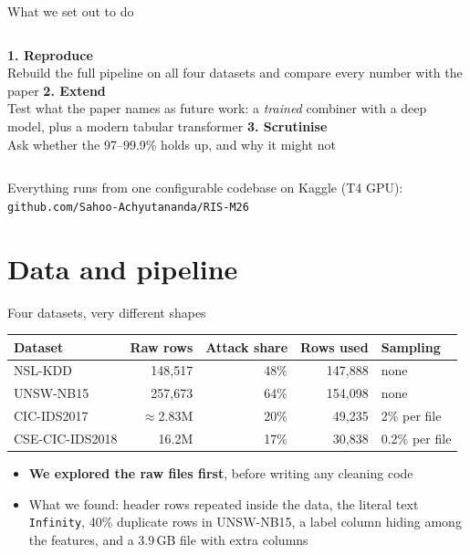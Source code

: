 \documentclass[aspectratio=169,11pt]{beamer}
\begin{document}
\begin{frame}{What we set out to do}
\begin{columns}[T]
\textcolor{accent}{\textbf{1. Reproduce}}\\[4pt]
\small Rebuild the full pipeline on all four datasets and compare every number with the paper
\textcolor{accent}{\textbf{2. Extend}}\\[4pt]
\small Test what the paper names as future work: a \emph{trained} combiner with a deep model, plus a modern tabular transformer
\textcolor{accent}{\textbf{3. Scrutinise}}\\[4pt]
\small Ask whether the 97--99.9\% holds up, and why it might not
\end{columns}
\vspace{10mm}
\begin{center}
\small Everything runs from one configurable codebase on Kaggle (T4 GPU):\\
\texttt{github.com/Sahoo-Achyutananda/RIS-M26}
\end{center}
\end{frame}

\section{Data and pipeline}

\begin{frame}{Four datasets, very different shapes}
\centering
\begin{tabular}{lrrrl}
\toprule
Dataset & Raw rows & Attack share & Rows used & Sampling \\
\midrule
NSL-KDD          & 148{,}517      & 48\% & 147{,}888 & none \\
UNSW-NB15        & 257{,}673      & 64\% & 154{,}098 & none \\
CIC-IDS2017      & $\approx$2.83M & 20\% & 49{,}235  & 2\% per file \\
CSE-CIC-IDS2018  & 16.2M          & 17\% & 30{,}838  & 0.2\% per file \\
\bottomrule
\end{tabular}
\vspace{6mm}
\begin{itemize}\small
  \item \textbf{We explored the raw files first}, before writing any cleaning code
  \item What we found: header rows repeated inside the data, the literal text \texttt{Infinity}, 40\% duplicate rows in
        UNSW-NB15, a label column hiding among the features, and a 3.9\,GB file with extra columns
\end{itemize}
\end{frame}
\end{document}
